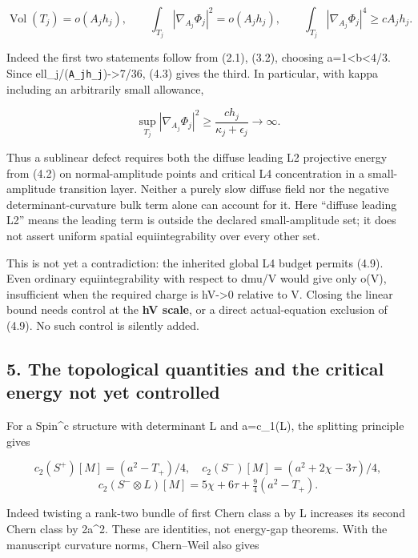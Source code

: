 \documentclass[
  10pt,
]{article}
\begin{document}
\[
 \operatorname{Vol}(T_j)=o(A_jh_j),\qquad
 \int_{T_j}|\nabla_{A_j}\Phi_j|^2=o(A_jh_j),\qquad
 \int_{T_j}|\nabla_{A_j}\Phi_j|^4\ge cA_jh_j.            \tag{4.9}
\]

Indeed the first two statements follow from (2.1), (3.2), choosing
a=1\textless b\textless4/3. Since ell\_j/(\nolinkurl{A_jh_j})-\textgreater7/36,
(4.3) gives the third. In particular, with kappa including an
arbitrarily small allowance,

\[
 \sup_{T_j}|\nabla_{A_j}\Phi_j|^2
       \ge\frac{c h_j}{\kappa_j+\epsilon_j}\longrightarrow\infty.
                                                        \tag{4.10}
\]

Thus a sublinear defect requires both the diffuse leading L2 projective
energy from (4.2) on normal-amplitude points and critical L4
concentration in a small-amplitude transition layer. Neither a purely
slow diffuse field nor the negative determinant-curvature bulk term
alone can account for it. Here ``diffuse leading L2'' means the leading
term is outside the declared small-amplitude set; it does not assert
uniform spatial equiintegrability over every other set.

This is not yet a contradiction: the inherited global L4 budget permits
(4.9). Even ordinary equiintegrability with respect to dmu/V would give
only o(V), insufficient when the required charge is hV-\textgreater0
relative to V. Closing the linear bound needs control at the \textbf{hV
scale}, or a direct actual-equation exclusion of (4.9). No such control
is silently added.

\hypertarget{the-topological-quantities-and-the-critical-energy-not-yet-controlled}{%
\subsection{5. The topological quantities and the critical energy not
yet
controlled}\label{the-topological-quantities-and-the-critical-energy-not-yet-controlled}}

For a Spin\^{}c structure with determinant L and a=c\_1(L), the
splitting principle gives

\[
 c_2(S^+)[M]=(a^2-T_+)/4,\quad
 c_2(S^-)[M]=(a^2+2\chi-3\tau)/4,
\] \[
 c_2(S^-\otimes L)[M]
   =5\chi+6\tau+\tfrac94(a^2-T_+).                    \tag{5.1}
\]

Indeed twisting a rank-two bundle of first Chern class a by L increases
its second Chern class by 2a\^{}2. These are identities, not energy-gap
theorems. With the manuscript curvature norms, Chern--Weil also gives
\end{document}

